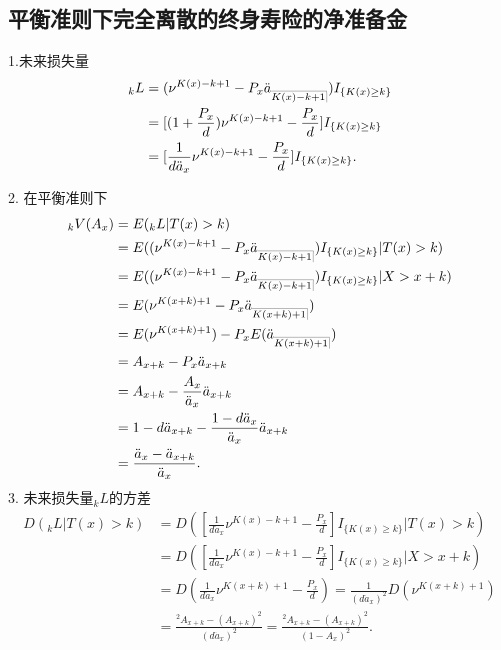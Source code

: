 \documentclass[lang=cn,10pt]{elegantbook}
\makeatletter
\DeclareRobustCommand{\annu}[1]{_{%
    \def\arraystretch{0}%
    \setlength\arraycolsep{1pt}%
    \setlength\arrayrulewidth{.2pt}%
    \begin{array}[b]{@{}c|}\hline
        \\[\arraycolsep]%
        \scriptstyle #1%
    \end{array}%
}}
\makeatother
\begin{document}
\subsection{平衡准则下完全离散的终身寿险的净准备金}
\begin{proposition}
    1.未来损失量
\begin{align*}
    {}_kL&= (\nu^{K(x)-k+1}-P_x \ddot a_{\annu {K(x)-k+1}} )I_{\{K(x)\ge k\}} \\
                        &= [ (1+\frac{P_x }{d} )\nu^{K(x)-k+1}-\frac{P_x}{d} ] I_{\{K(x)\ge k\}}\\
                        &= [\frac{1}{d\ddot a_x}\nu^{K(x)-k+1}-\frac{P_x }{d} ]I_{\{K(x)\ge k\}}.
\end{align*}

2. 在平衡准则下
\begin{align*}
    {}_kV(A_x)&=E({}_kL|T(x)>k) \\
                        &=E((\nu^{K(x)-k+1}-P_x \ddot a_{\annu {K(x)-k+1}})I_{\{K(x)\ge k\}}|T(x)>k)\\
                        &=E ( (\nu^{K(x)-k+1}-P_x \ddot a_{\annu {K(x)-k+1}} )I_{\{K(x)\ge k\}}|X>x+k )\\
                        &=E (\nu^{K(x+k)+1}-P_x \ddot a_{\annu {K(x+k)+1}} )\\
                        &=E (\nu^{K(x+k)+1} )-P_x E (\ddot a_{\annu {K(x+k)+1}} )\\
                        &= A_{x+k}-P_x\ddot a_{x+k}\\
                        &= A_{x+k}-\frac{ A_x}{\ddot a_x}\ddot a_{x+k}\\
                        &=1-d\ddot a_{x+k}-\frac{1-d \ddot a_x}{\ddot a_x}\ddot a_{x+k}\\
                        &=\frac{\ddot a_x-\ddot a_{x+k}}{\ddot a_x}.
\end{align*}
3. 未来损失量$_kL$的方差
\begin{align*}
    D(_kL|T(x)>k) &=D ( [\frac{1}{d\ddot a_x}\nu^{K(x)-k+1}-\frac{P_x }{d} ]I_{\{K(x)\ge k\}}|T(x)>k )\\
                        &=D ( [\frac{1}{d\ddot a_x}\nu^{K(x)-k+1}-\frac{P_x }{d} ]I_{\{K(x)\ge k\}}|X>x+k )\\
                        &=D (\frac{1}{d\ddot a_x}\nu^{K(x+k)+1}-\frac{P_x }{d} )
                        =\frac{1}{(d\ddot a_x)^2}D(\nu^{K(x+k)+1})\\
                        &=\frac{{}^2 A_{x+k}-( A_{x+k})^2}{(d\ddot a_x)^2}=\frac{{}^2 A_{x+k}-( A_{x+k})^2}{(1-A_x)^2}.\\                 \end{align*}
\end{proposition}
\end{document}
